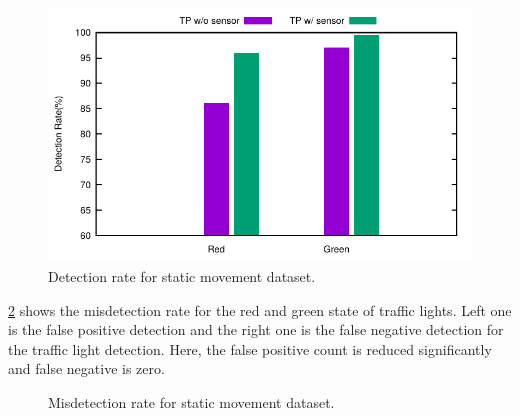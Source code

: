 \begin{figure}[h!]
\centering
\includegraphics[width=5.2in]{plots/bar_tp.pdf}
\caption{Detection rate for static movement dataset.}
\label{f:tp_stat}
\end{figure}

\ref{f:fp_stat} shows the misdetection rate for the red and green state of traffic lights.
Left one is the false positive detection and the right one is the false negative detection for the traffic light detection.
Here, the false positive count is reduced significantly and false negative is zero.

\begin{figure}[!ht]
\centering
{}

\caption{Misdetection rate for static movement dataset.}
\label{f:fp_stat}
\end{figure}

